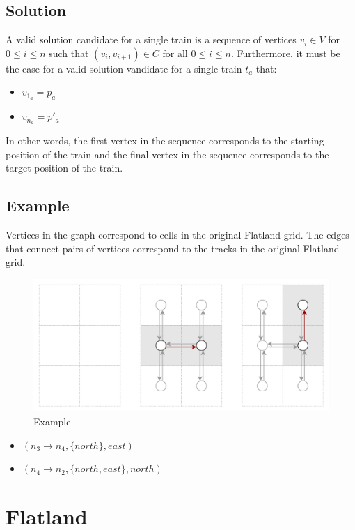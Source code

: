 \subsection{Solution}\label{sec:solution}
A valid solution candidate for a single train is a sequence of vertices $v_i \in V$ for $0 \leq i \leq n$ such that $(v_i,v_{i+1}) \in C$ for all $0 \leq i \leq n$.  Furthermore, it must be the case for a valid solution vandidate for a single train $t_a$ that:
\begin{itemize}
	\item $v_{1_a} = p_a$
	\item $v_{n_a} = p'_a$
\end{itemize}
\noindent In other words, the first vertex in the sequence corresponds to the starting position of the train and the final vertex in the sequence corresponds to the target position of the train.

\subsection{Example}\label{sec:example}
Vertices in the graph correspond to cells in the original Flatland grid.  The edges that connect pairs of vertices correspond to the tracks in the original Flatland grid.  

\begin{figure}
\centering
        \includegraphics[width=\linewidth]{img/edges.png}
    \caption{Example}
    \label{fig:verticalcell}
\end{figure}

\begin{itemize}
	\item $(n_3 \rightarrow n_4, \{north\}, east)$
	\item $(n_4 \rightarrow n_2, \{north, east\}, north)$
\end{itemize}

\pagebreak

\section{Flatland}\label{sec:flatland}

